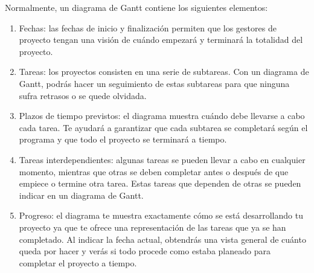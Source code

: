 \documentclass[../main]{subfiles}
\begin{document}
Normalmente, un diagrama de Gantt contiene los siguientes elementos:
\begin{enumerate}
    \item Fechas: las fechas de inicio y finalización permiten que los gestores de proyecto tengan una visión de cuándo empezará y terminará la totalidad del proyecto.
\item Tareas: los proyectos consisten en una serie de subtareas. Con un diagrama de Gantt, podrás hacer un seguimiento de estas subtareas para que ninguna sufra retrasos o se quede olvidada.
\item Plazos de tiempo previstos: el diagrama muestra cuándo debe llevarse a cabo cada tarea. Te ayudará a garantizar que cada subtarea se completará según el programa y que todo el proyecto se terminará a tiempo.
\item Tareas interdependientes: algunas tareas se pueden llevar a cabo en cualquier momento, mientras que otras se deben completar antes o después de que empiece o termine otra tarea. Estas tareas que dependen de otras se pueden indicar en un diagrama de Gantt.
\item Progreso: el diagrama te muestra exactamente cómo se está desarrollando tu proyecto ya que te ofrece una representación de las tareas que ya se han completado. Al indicar la fecha actual, obtendrás una vista general de cuánto queda por hacer y verás si todo procede como estaba planeado para completar el proyecto a tiempo.
\end{enumerate}
\end{document}
